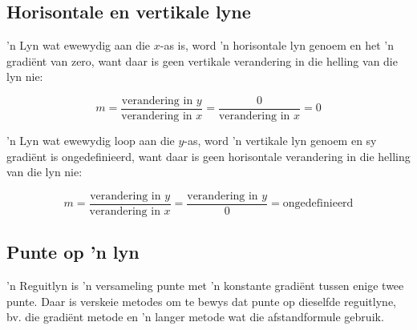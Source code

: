 \subsection*{Horisontale en vertikale lyne}

'n Lyn wat ewewydig aan die $x$-as is, word 'n horisontale lyn genoem en het 'n gradi\"ent van zero, want daar is geen vertikale verandering in die helling van die lyn nie:\par
\begin{equation*}
m = \dfrac{\mbox{verandering in }y}{\mbox{verandering in }x} = \dfrac{0}{\mbox{verandering in }x} =0
\end{equation*}


'n Lyn wat ewewydig loop aan die $y$-as, word 'n vertikale lyn genoem en sy gradi\"ent is ongedefinieerd, want daar is geen horisontale verandering in die helling van die lyn nie:\par
\begin{equation*}
 m = \dfrac{\mbox{verandering in }y}{\mbox{verandering in }x} = \dfrac{\mbox{verandering in }y}{0}= \mbox{ongedefinieerd}
\end{equation*}


\subsection*{Punte op 'n lyn}

'n Reguitlyn is 'n versameling punte met 'n konstante gradi\"ent tussen enige twee punte. Daar is verskeie metodes om te bewys dat punte op dieselfde reguitlyne, bv. die gradi\"ent metode en 'n langer metode wat die afstandformule gebruik. 

